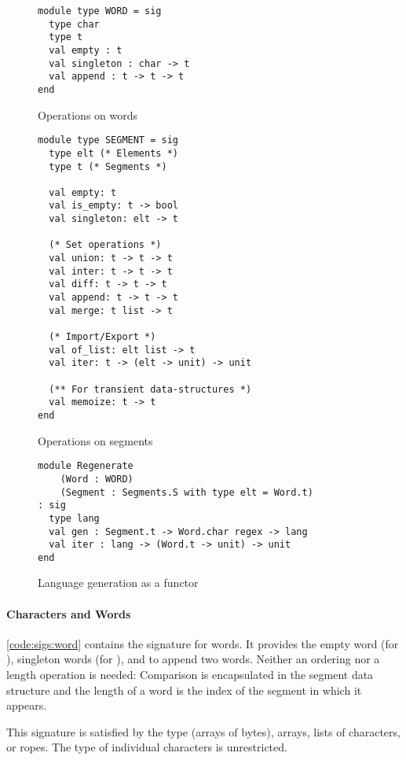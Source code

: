 \begin{figure}[tp]
\begin{lstlisting}
module type WORD = sig
  type char
  type t
  val empty : t
  val singleton : char -> t
  val append : t -> t -> t
end
\end{lstlisting}
\vspace{-\baselineskip}
    \caption{Operations on words}
    \label{code:sigs:word}

\begin{lstlisting}
module type SEGMENT = sig
  type elt (* Elements *)
  type t (* Segments *)

  val empty: t
  val is_empty: t -> bool
  val singleton: elt -> t

  (* Set operations *)
  val union: t -> t -> t
  val inter: t -> t -> t
  val diff: t -> t -> t
  val append: t -> t -> t
  val merge: t list -> t

  (* Import/Export *)
  val of_list: elt list -> t
  val iter: t -> (elt -> unit) -> unit

  (** For transient data-structures *)
  val memoize: t -> t
end
\end{lstlisting}
\vspace{-\baselineskip}
    \caption{Operations on segments}
    \label{code:sigs:segment}
    
\begin{lstlisting}
module Regenerate
    (Word : WORD)
    (Segment : Segments.S with type elt = Word.t)
: sig
  type lang
  val gen : Segment.t -> Word.char regex -> lang
  val iter : lang -> (Word.t -> unit) -> unit
end
\end{lstlisting}
\vspace{-\baselineskip}
    \caption{Language generation as a functor}
    \label{code:sigs:regen}
\end{figure}

\paragraph{Characters and Words}

\autoref{code:sigs:word} contains the signature for words.
It provides
the empty word (for ),
singleton words (for ), and to append two words.
Neither an ordering nor a length operation is needed:
Comparison is encapsulated in the segment
data structure and the length of a word is the index of the segment in
which it appears.

This signature is satisfied by the \ocaml {}
type (\ie arrays of bytes), arrays, lists of characters, or ropes. The
type of individual characters is unrestricted.

